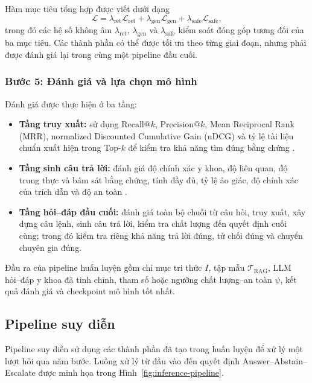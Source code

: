 Hàm mục tiêu tổng hợp được viết dưới dạng
\[
    \mathcal{L}
    =\lambda_{\mathrm{ret}}\mathcal{L}_{\mathrm{ret}}
    +\lambda_{\mathrm{gen}}\mathcal{L}_{\mathrm{gen}}
    +\lambda_{\mathrm{safe}}\mathcal{L}_{\mathrm{safe}},
\]
trong đó các hệ số không âm $\lambda_{\mathrm{ret}}$, $\lambda_{\mathrm{gen}}$ và $\lambda_{\mathrm{safe}}$ kiểm soát đóng góp tương đối của ba mục tiêu. Các thành phần có thể được tối ưu theo từng giai đoạn, nhưng phải được đánh giá lại trong cùng một pipeline đầu cuối.

\subsubsection*{Bước 5: Đánh giá và lựa chọn mô hình}

Đánh giá được thực hiện ở ba tầng:
\begin{itemize}
    \item \textbf{Tầng truy xuất:} sử dụng $\mathrm{Recall}@k$, $\mathrm{Precision}@k$, Mean Reciprocal Rank (MRR), normalized Discounted Cumulative Gain (nDCG) và tỷ lệ tài liệu chuẩn xuất hiện trong Top-$k$ để kiểm tra khả năng tìm đúng bằng chứng \cite{xiong2024mirage}.
    \item \textbf{Tầng sinh câu trả lời:} đánh giá độ chính xác y khoa, độ liên quan, độ trung thực và bám sát bằng chứng, tính đầy đủ, tỷ lệ ảo giác, độ chính xác của trích dẫn và độ an toàn \cite{ragas2023, medtrustrag}.
    \item \textbf{Tầng hỏi--đáp đầu cuối:} đánh giá toàn bộ chuỗi từ câu hỏi, truy xuất, xây dựng câu lệnh, sinh câu trả lời, kiểm tra chất lượng đến quyết định cuối cùng; trong đó kiểm tra riêng khả năng trả lời đúng, từ chối đúng và chuyển chuyên gia đúng.
\end{itemize}

Đầu ra của pipeline huấn luyện gồm chỉ mục tri thức $I$, tập mẫu $\mathcal{T}_{\mathrm{RAG}}$, LLM hỏi--đáp y khoa đã tinh chỉnh, tham số hoặc ngưỡng chất lượng--an toàn $\psi$, kết quả đánh giá và checkpoint mô hình tốt nhất.

\subsection{Pipeline suy diễn}

Pipeline suy diễn sử dụng các thành phần đã tạo trong huấn luyện để xử lý một lượt hỏi qua năm bước. Luồng xử lý từ đầu vào đến quyết định Answer--Abstain--Escalate được minh họa trong Hình~\ref{fig:inference-pipeline}.

